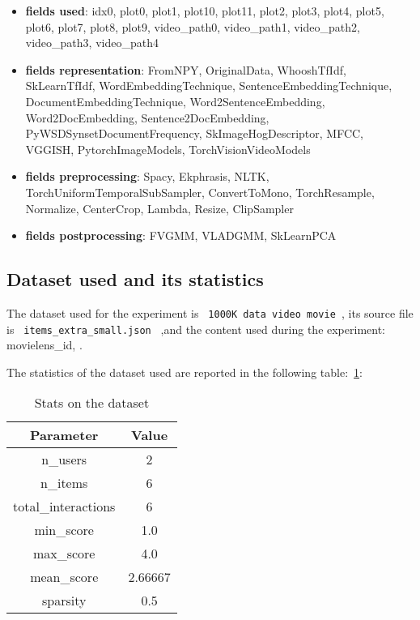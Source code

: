 \documentclass[11pt]{article}
\begin{document}
\begin{itemize}
    \item \textbf{fields used}:  idx0, plot0, plot1, plot10, plot11, plot2, plot3, plot4, plot5, plot6, plot7, plot8, plot9, video\_path0, video\_path1, video\_path2, video\_path3, video\_path4

    \item \textbf{fields representation}:  FromNPY, OriginalData, WhooshTfIdf, SkLearnTfIdf, WordEmbeddingTechnique, SentenceEmbeddingTechnique, DocumentEmbeddingTechnique, Word2SentenceEmbedding, Word2DocEmbedding, Sentence2DocEmbedding, PyWSDSynsetDocumentFrequency, SkImageHogDescriptor, MFCC, VGGISH, PytorchImageModels, TorchVisionVideoModels

    \item \textbf{fields preprocessing}:  Spacy, Ekphrasis, NLTK, TorchUniformTemporalSubSampler, ConvertToMono, TorchResample, Normalize, CenterCrop, Lambda, Resize, ClipSampler

    \item \textbf{fields postprocessing}:  FVGMM, VLADGMM, SkLearnPCA
\end{itemize}





\hfill\break
\subsection{Dataset used and its statistics}
The dataset used for the experiment is  \lstinline[style=verbatim-text]| 1000K data video movie |,
its source file is \lstinline[style=verbatim-text]| items_extra_small.json | ,and the content used during the experiment:
     movielens\_id,
.


The statistics of the dataset used are reported in the following table:~\ref{tab:dataset_table}:
\begin{table}[ht]
    \centering
  \begin{tabular}{|c|c|}
    \hline
    \textbf{Parameter}& \textbf{Value} \\ \hline
    n\_users  & 2\\ \hline
    n\_items  & 6\\ \hline
    total\_interactions  & 6\\ \hline
    min\_score  & 1.0\\ \hline
    max\_score  & 4.0\\ \hline
    mean\_score  & 2.66667\\ \hline
    sparsity  & 0.5\\ \hline
  \end{tabular}
   \caption{Stats on the dataset}\label{tab:dataset_table}
\end{table}
\end{document}
